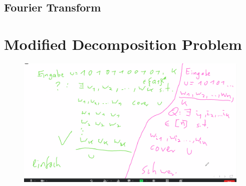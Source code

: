 \subsection{Fourier Transform}


\section{Modified Decomposition Problem}
\begin{figure}[h]
	\includegraphics[width=\linewidth]{proof-sketches/Screenshot[2]-01.png}
\end{figure}

